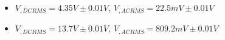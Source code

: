 \begin{itemize}
     \item $V_{, DCRMS}=4.35V\pm 0.01\unit{V}$, $V_{, ACRMS}=22.5mV\pm 0.01\unit{V}$ 
     \item $V_{, DCRMS}=13.7V\pm 0.01\unit{V}$, $V_{, ACRMS}=809.2mV\pm 0.01\unit{V}$\\
\end{itemize}